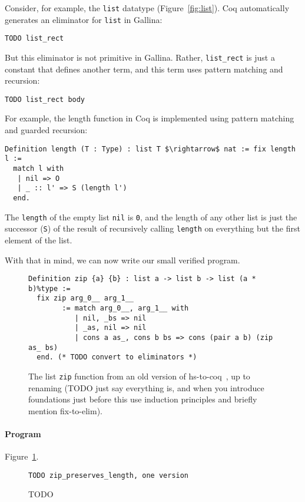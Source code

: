 Consider, for example, the \lstinline{list} datatype (Figure~\ref{fig:list}). %
Coq automatically generates an eliminator for \lstinline{list} in Gallina:

\begin{lstlisting}
TODO list_rect
\end{lstlisting}
But this eliminator is not primitive in Gallina.
Rather, \lstinline{list_rect} is just a constant that defines another term,
and this term uses pattern matching and recursion:

\begin{lstlisting}
TODO list_rect body
\end{lstlisting}

For example, the length function in Coq is implemented using pattern matching and guarded recursion:

\begin{lstlisting}
Definition length (T : Type) : list T $\rightarrow$ nat := fix length l :=
  match l with
   | nil => O
   | _ :: l' => S (length l')
  end.
\end{lstlisting}
The \lstinline{length} of the empty list \lstinline{nil} is \lstinline{0}, and the length of any other list
is just the successor (\lstinline{S}) of the result of recursively calling \lstinline{length} on everything but the first element of the list.

With that in mind, we can now write our small verified program.

\begin{figure}
\begin{lstlisting}
Definition zip {a} {b} : list a -> list b -> list (a * b)%type :=
  fix zip arg_0__ arg_1__
        := match arg_0__, arg_1__ with
           | nil, _bs => nil
           | _as, nil => nil
           | cons a as_, cons b bs => cons (pair a b) (zip as_ bs)
  end. (* TODO convert to eliminators *)
\end{lstlisting}
\caption{The list \lstinline{zip} function from an old version of hs-to-coq~\cite{TODO}, up to renaming (TODO just say everything is, and when you introduce foundations just before this use induction principles and briefly mention fix-to-elim).}
\label{fig:zip}
\end{figure}

\paragraph{Program} Figure~\ref{fig:zip}.

\begin{figure}
\begin{lstlisting}
TODO zip_preserves_length, one version
\end{lstlisting}
\caption{TODO}
\label{fig:zip-pres}
\end{figure}

